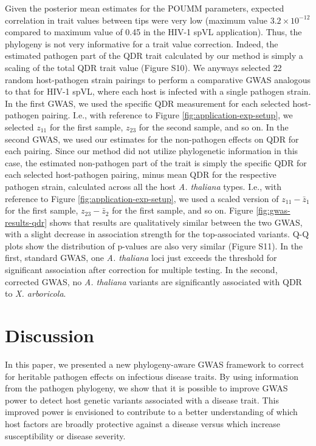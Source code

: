 \documentclass[11pt]{article}
\begin{document}
\begin{linenumbers}
Given the posterior mean estimates for the POUMM parameters, expected correlation in trait values between tips were very low (maximum value $3.2 \times 10^{-12}$ compared to maximum value of 0.45 in the HIV-1 spVL application). Thus, the phylogeny is not very informative for a trait value correction. Indeed, the estimated pathogen part of the QDR trait calculated by our method is simply a scaling of the total QDR trait value (Figure S10). We anyways selected 22 random host-pathogen strain pairings to perform a comparative GWAS analogous to that for HIV-1 spVL, where each host is infected with a single pathogen strain. In the first GWAS, we used the specific QDR measurement for each selected host-pathogen pairing. I.e., with reference to Figure \ref{fig:application-exp-setup}, we selected $z_{11}$ for the first sample, $z_{23}$ for the second sample, and so on. In the second GWAS, we used our estimates for the non-pathogen effects on QDR for each pairing. Since our method did not utilize phylogenetic information in this case, the estimated non-pathogen part of the trait is simply the specific QDR for each selected host-pathogen pairing, minus mean QDR for the respective pathogen strain, calculated across all the host \emph{A. thaliana} types. I.e., with reference to Figure \ref{fig:application-exp-setup}, we used a scaled version of $z_{11} - \bar{z}_1$ for the first sample, $z_{23} - \bar{z}_2$ for the first sample, and so on. Figure \ref{fig:gwas-results-qdr} shows that results are qualitatively similar between the two GWAS, with a slight decrease in association strength for the top-associated variants. Q-Q plots show the distribution of p-values are also very similar (Figure S11). In the first, standard GWAS, one \emph{A. thaliana} loci just exceeds the threshold for significant association after correction for multiple testing. In the second, corrected GWAS, no \emph{A. thaliana} variants are significantly associated with QDR to \emph{X. arboricola}.

\section*{Discussion}
In this paper, we presented a new phylogeny-aware GWAS framework to correct for heritable pathogen effects on infectious disease traits. By using information from the pathogen phylogeny, we show that it is possible to improve GWAS power to detect host genetic variants associated with a disease trait. This improved power is envisioned to contribute to a better understanding of which host factors are broadly protective against a disease versus which increase susceptibility or disease severity.


\end{linenumbers}
\end{document}
